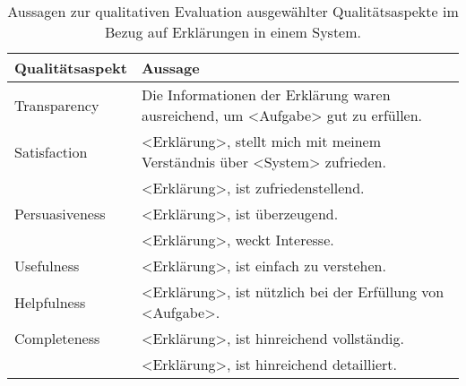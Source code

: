 \begin{table}[htb!]
    \begin{center}
        \begin{tabular}{|p{} p{}|}
            \hline
            \textbf{Qualitätsaspekt} & \textbf{Aussage} \\
            \hline
            \hline
            Transparency    & Die Informationen der Erklärung waren ausreichend, um <Aufgabe> gut zu erfüllen. 
                                \cite[vgl.][]{wang_is_2018, balog_measuring_2020} \\
            \hline
            Satisfaction    & <Erklärung>, stellt mich mit meinem Verständnis über <System> zufrieden.
                                \cite[vgl.][]{riveiro_thats_2021} \\
                            & <Erklärung>, ist zufriedenstellend.
                                \cite[vgl.][]{riveiro_thats_2021, hoffman_metrics_nodate, balog_measuring_2020} \\
            \hline
            Persuasiveness  & <Erklärung>, ist überzeugend.
                                \cite[vgl.][]{sato_action-triggering_2019, sato_context_nodate} \\
                            & <Erklärung>, weckt Interesse. 
                                \cite[vgl.][]{sato_action-triggering_2019, sato_context_nodate} \\
            \hline
            Usefulness      & <Erklärung>, ist einfach zu verstehen. 
                                \cite[vgl.][]{sato_action-triggering_2019, sato_context_nodate} \\
            Helpfulness     & <Erklärung>, ist nützlich bei der Erfüllung von <Aufgabe>.
                                \cite[vgl.][]{sato_action-triggering_2019, sato_context_nodate, hoffman_metrics_nodate, balog_measuring_2020} \\
            \hline
            Completeness    & <Erklärung>, ist hinreichend vollständig.
                                \cite[vgl.][]{hoffman_metrics_nodate, riveiro_thats_2021} \\
                            & <Erklärung>, ist hinreichend detailliert.
                                \cite[vgl.][]{riveiro_thats_2021} \\
            \hline
        \end{tabular}
    \end{center}
    \caption{Aussagen zur qualitativen Evaluation ausgewählter Qualitätsaspekte im Bezug auf Erklärungen in einem System.}
    \label{tab:evaluation_qualitative_explanation_measures}
\end{table}

